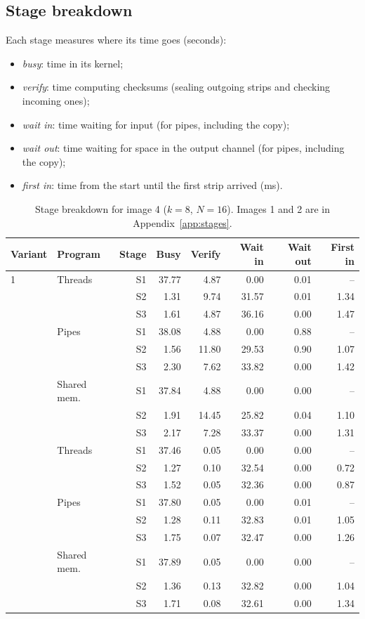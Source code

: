 \documentclass[11pt,a4paper]{article}
\newcommand{\cfgK}{8}
\newcommand{\cfgRing}{16}
\begin{document}
\subsection{Stage breakdown}
\label{sec:stages}
Each stage measures where its time goes (seconds):
\begin{itemize}
\item \emph{busy}: time in its kernel;
\item \emph{verify}: time computing checksums (sealing outgoing strips and checking incoming ones);
\item \emph{wait in}: time waiting for input (for pipes, including the copy);
\item \emph{wait out}: time waiting for space in the output channel (for pipes, including the copy);
\item \emph{first in}: time from the start until the first strip arrived (ms).
\end{itemize}
\begin{table}[htbp]
\centering
\caption{Stage breakdown for image 4 ($k=\cfgK$, $N=\cfgRing$). Images 1 and 2 are in
Appendix~\ref{app:stages}.}
\label{tab:stages4}
\begin{tabular}{llrrrrrr}
\toprule
Variant & Program & Stage & Busy & Verify & Wait in & Wait out & First in \\
\midrule
1 & Threads & S1 & 37.77 & 4.87 & 0.00 & 0.01 & -- \\
 &  & S2 & 1.31 & 9.74 & 31.57 & 0.01 & 1.34 \\
 &  & S3 & 1.61 & 4.87 & 36.16 & 0.00 & 1.47 \\
\addlinespace
1 & Pipes & S1 & 38.08 & 4.88 & 0.00 & 0.88 & -- \\
 &  & S2 & 1.56 & 11.80 & 29.53 & 0.90 & 1.07 \\
 &  & S3 & 2.30 & 7.62 & 33.82 & 0.00 & 1.42 \\
\addlinespace
1 & Shared mem. & S1 & 37.84 & 4.88 & 0.00 & 0.00 & -- \\
 &  & S2 & 1.91 & 14.45 & 25.82 & 0.04 & 1.10 \\
 &  & S3 & 2.17 & 7.28 & 33.37 & 0.00 & 1.31 \\
\addlinespace
2 & Threads & S1 & 37.46 & 0.05 & 0.00 & 0.00 & -- \\
 &  & S2 & 1.27 & 0.10 & 32.54 & 0.00 & 0.72 \\
 &  & S3 & 1.52 & 0.05 & 32.36 & 0.00 & 0.87 \\
\addlinespace
2 & Pipes & S1 & 37.80 & 0.05 & 0.00 & 0.01 & -- \\
 &  & S2 & 1.28 & 0.11 & 32.83 & 0.01 & 1.05 \\
 &  & S3 & 1.75 & 0.07 & 32.47 & 0.00 & 1.26 \\
\addlinespace
2 & Shared mem. & S1 & 37.89 & 0.05 & 0.00 & 0.00 & -- \\
 &  & S2 & 1.36 & 0.13 & 32.82 & 0.00 & 1.04 \\
 &  & S3 & 1.71 & 0.08 & 32.61 & 0.00 & 1.34 \\
\bottomrule
\end{tabular}
\end{table}
\end{document}
